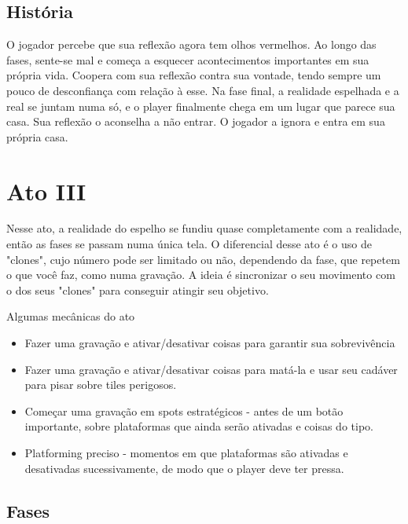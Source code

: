 \documentclass[a4paper, 11pt]{article}
\begin{document}
\begin{itemize}
 
\subsection{História} 
 
	O jogador percebe que sua reflexão agora tem olhos vermelhos. Ao longo das fases, sente-se mal e começa a esquecer acontecimentos importantes em sua própria vida. Coopera com sua reflexão contra sua vontade, tendo sempre um pouco de desconfiança com relação à esse. Na fase final, a realidade espelhada e a real se juntam numa só, e o player finalmente chega em um lugar que parece sua casa. Sua reflexão o aconselha a não entrar. O jogador a ignora e entra em sua própria casa.
 
\section{Ato III} 
 
	Nesse ato, a realidade do espelho se fundiu quase completamente com a realidade, então as fases se passam numa única 
	tela. O diferencial desse ato é o uso de "clones", cujo número pode ser limitado ou não, dependendo da fase, que repetem o que você faz, como numa gravação. A ideia é sincronizar o seu movimento com o dos seus "clones" para conseguir atingir seu objetivo. 
 
	Algumas mecânicas do ato 
	\begin{itemize} 
		\item Fazer uma gravação e ativar/desativar coisas para garantir sua sobrevivência
		\item Fazer uma gravação e ativar/desativar coisas para matá-la e usar seu cadáver para pisar sobre tiles perigosos.
		\item Começar uma gravação em spots estratégicos - antes de um botão importante, sobre plataformas que ainda serão ativadas e coisas do tipo.
		\item Platforming preciso - momentos em que plataformas são ativadas e desativadas sucessivamente, de modo que o player deve ter pressa.
	\end{itemize} 
 
 
\subsection{Fases} 
 

\end{itemize}
\end{document}
